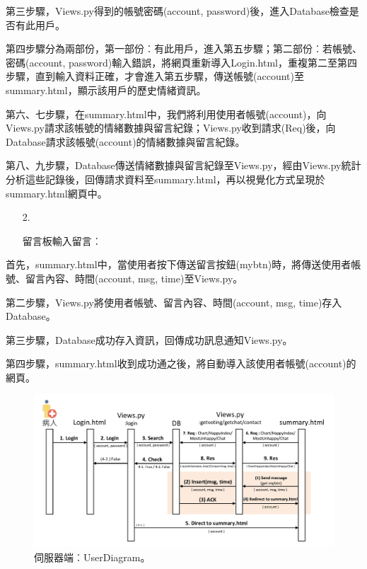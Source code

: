 \documentclass[12pt]{scrreprt}
\begin{document}
第三步驟，Views.py得到的帳號密碼(account, password)後，進入Database檢查是否有此用戶。

第四步驟分為兩部份，第一部份︰有此用戶，進入第五步驟；第二部份︰若帳號、密碼(account, password)輸入錯誤，將網頁重新導入Login.html，重複第二至第四步驟，直到輸入資料正確，才會進入第五步驟，傳送帳號(account)至summary.html，顯示該用戶的歷史情緒資訊。

第六、七步驟，在summary.html中，我們將利用使用者帳號(account)，向Views.py請求該帳號的情緒數據與留言紀錄；Views.py收到請求(Req)後，向Database請求該帳號(account)的情緒數據與留言紀錄。

第八、九步驟，Database傳送情緒數據與留言紀錄至Views.py，經由Views.py統計分析這些記錄後，回傳請求資料至summary.html，再以視覺化方式呈現於summary.html網頁中。


\begin{itemize}
\item[2.]{\begin{bfseries}留言板輸入留言︰\end{bfseries}}
\end{itemize}

首先，summary.html中，當使用者按下傳送留言按鈕(mybtn)時，將傳送使用者帳號、留言內容、時間(account, msg, time)至Views.py。

第二步驟，Views.py將使用者帳號、留言內容、時間(account, msg, time)存入Database。

第三步驟，Database成功存入資訊，回傳成功訊息通知Views.py。

第四步驟，summary.html收到成功通之後，將自動導入該使用者帳號(account)的網頁。


\begin{figure}[!h]
\begin{center}
\includegraphics[width=1\textwidth]{./figs/diagrams/user/server-UserDiagram.pdf}
\end{center}
\vspace{-0.5cm}
\caption{伺服器端︰UserDiagram。}
\label{fig:server-UserDiagram}
\end{figure}
\end{document}
